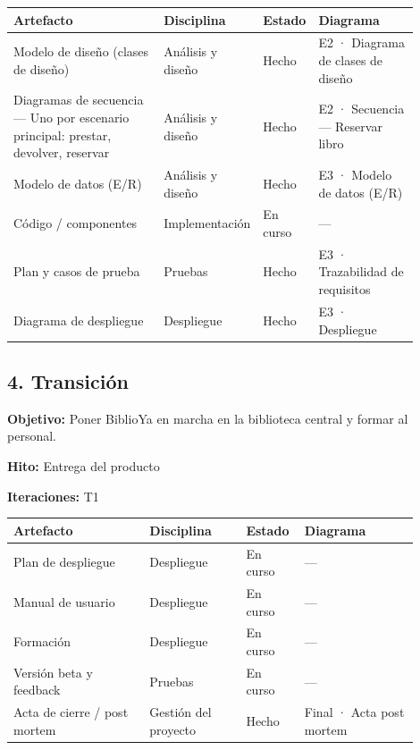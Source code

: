 \documentclass[11pt,a4paper]{article}
\begin{document}
{\small
\begin{longtable}{@{}>{\raggedright\arraybackslash}p{0.380\linewidth}>{\raggedright\arraybackslash}p{0.172\linewidth}>{\raggedright\arraybackslash}p{0.091\linewidth}>{\raggedright\arraybackslash}p{0.254\linewidth}@{}}
\toprule
\textbf{Artefacto} & \textbf{Disciplina} & \textbf{Estado} & \textbf{Diagrama} \\
\midrule
\endhead
Modelo de diseño (clases de diseño) & Análisis y diseño & Hecho & E2 · Diagrama de clases de diseño \\
Diagramas de secuencia — Uno por escenario principal: prestar, devolver, reservar & Análisis y diseño & Hecho & E2 · Secuencia — Reservar libro \\
Modelo de datos (E/R) & Análisis y diseño & Hecho & E3 · Modelo de datos (E/R) \\
Código / componentes & Implementación & En curso & — \\
Plan y casos de prueba & Pruebas & Hecho & E3 · Trazabilidad de requisitos \\
Diagrama de despliegue & Despliegue & Hecho & E3 · Despliegue \\
\bottomrule
\end{longtable}}

\subsection*{4. Transición}

\textbf{Objetivo:} Poner BiblioYa en marcha en la biblioteca central y formar al personal.

\textbf{Hito:} Entrega del producto

\textbf{Iteraciones:} T1

{\small
\begin{longtable}{@{}>{\raggedright\arraybackslash}p{0.311\linewidth}>{\raggedright\arraybackslash}p{0.224\linewidth}>{\raggedright\arraybackslash}p{0.096\linewidth}>{\raggedright\arraybackslash}p{0.267\linewidth}@{}}
\toprule
\textbf{Artefacto} & \textbf{Disciplina} & \textbf{Estado} & \textbf{Diagrama} \\
\midrule
\endhead
Plan de despliegue & Despliegue & En curso & — \\
Manual de usuario & Despliegue & En curso & — \\
Formación & Despliegue & En curso & — \\
Versión beta y feedback & Pruebas & En curso & — \\
Acta de cierre / post mortem & Gestión del proyecto & Hecho & Final · Acta post mortem \\
\bottomrule
\end{longtable}}
\end{document}
